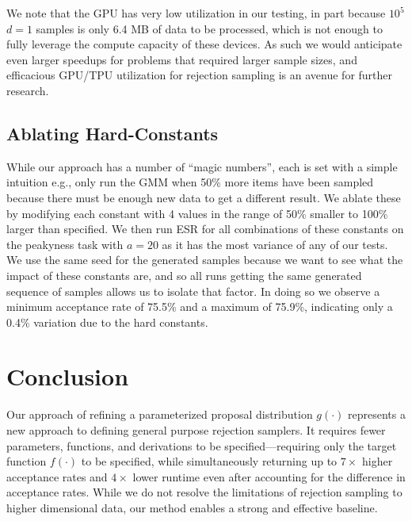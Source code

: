 \documentclass{ecai}  %
\begin{document}
We note that the GPU has very low utilization in our testing, in part because $10^5$ $d=1$ samples is only 6.4 MB of data to be processed, which is not enough to fully leverage the compute capacity of these devices. As such we would anticipate even larger speedups for problems that required larger sample sizes, and efficacious GPU/TPU utilization for rejection sampling is an avenue for further research. 

\subsection{Ablating Hard-Constants}

While our approach has a number of ``magic numbers'', each is set with a simple intuition e.g., only run the GMM when 50\% more items have been sampled because there must be enough new data to get a different result. We ablate these by modifying each constant with 4 values in the range of 50\% smaller to 100\% larger than specified. We then run ESR for all combinations of these constants on the peakyness task with $a=20$ as it has the most variance of any of our tests. We use the same seed for the generated samples because we want to see what the impact of these constants are, and so all runs getting the same generated sequence of samples allows us to isolate that factor. In doing so we observe a minimum acceptance rate of 75.5\% and a maximum of 75.9\%, indicating only a 0.4\% variation due to the hard constants. 

%

%

\section{Conclusion} \label{sec:conclusion}

Our approach of refining a parameterized proposal distribution $g(\cdot)$ represents a new approach to defining general purpose rejection samplers. It requires fewer parameters, functions, and derivations to be specified---requiring only the target function $f(\cdot)$ to be specified, while simultaneously returning up to $7\times$ higher acceptance rates and $4\times$ lower runtime even after accounting for the difference in acceptance rates. While we do not resolve the limitations of rejection sampling to higher dimensional data, our method enables a strong and effective baseline. 

%
%
%

%


%
\end{document}
